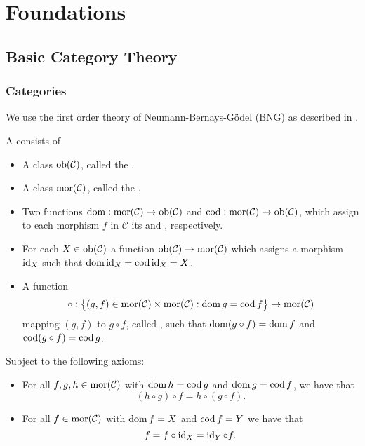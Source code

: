 \chapter{Foundations}
\section{Basic Category Theory}
\subsection{Categories}

We use the first order theory of Neumann-Bernays-G\"odel (BNG) as described in \cite[231]{mendelson:logic:2015}.

\begin{definition}[Category]
	A  consists of 
	\begin{itemize}[leftmargin = *]
		\item A class $\operatorname{ob}(\mathcal{C})$, called the .
		\item A class $\operatorname{mor}(\mathcal{C})$, called the .
		\item Two functions $\operatorname{dom} : \operatorname{mor}(\mathcal{C}) \to \operatorname{ob}(\mathcal{C})$ and $\operatorname{cod} : \operatorname{mor}(\mathcal{C}) \to \operatorname{ob}(\mathcal{C})$, which assign to each morphism $f$ in $\mathcal{C}$ its  and , respectively.
		\item For each $X \in \operatorname{ob}(\mathcal{C})$ a function $\operatorname{ob}(\mathcal{C}) \to \operatorname{mor}(\mathcal{C})$ which assigns a morphism $\operatorname{id}_X$ such that $\operatorname{dom} \operatorname{id}_X = \operatorname{cod} \operatorname{id}_X = X$.
		\item A function 
			\begin{equation}
				\circ : \cbr{(g,f) \in \mor(\mathcal{C}) \times \mor(\mathcal{C}) : \dom g = \cod f} \to \mor(\mathcal{C}) 
			\end{equation}
			mapping $(g,f)$ to $g \circ f$, called , such that $\operatorname{dom}(g \circ f) = \operatorname{dom} f$ and $\operatorname{cod}(g \circ f) = \operatorname{cod} g$.
	\end{itemize}
	Subject to the following axioms:
	\begin{itemize}[leftmargin = *]
		\item {} For all $f,g,h \in \operatorname{mor}(\mathcal{C})$ with $\operatorname{dom} h = \operatorname{cod} g$ and $\operatorname{dom} g = \operatorname{cod} f$, we have that
			\begin{equation}
				(h \circ g) \circ f = h \circ (g \circ f).
			\end{equation}
		\item {} For all $f \in \operatorname{mor}(\mathcal{C})$ with $\operatorname{dom} f = X$ and $\operatorname{cod} f = Y$ we have that
			\begin{equation}
				f = f \circ \operatorname{id}_X = \operatorname{id}_Y \circ f.
			\end{equation}
	\end{itemize}
\end{definition}

